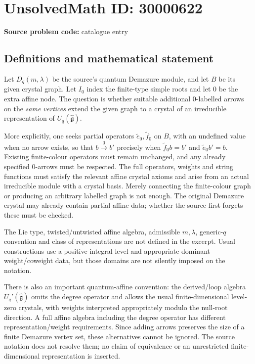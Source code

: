 \documentclass[11pt]{article}
\begin{document}
\section*{UnsolvedMath ID: 30000622}
\textbf{Source problem code:} catalogue entry
\subsection{Definitions and mathematical statement}
Let $D_q(m,\lambda)$ be the source's quantum Demazure module, and let $B$ be its given crystal graph. Let $I_0$ index the finite-type simple roots and let $0$ be the extra affine node. The question is whether suitable additional $0$-labelled arrows on the \emph{same vertices} extend the given graph to a crystal of an irreducible representation of $U_q(\widehat{\mathfrak g})$.

More explicitly, one seeks partial operators $\widetilde e_0,\widetilde f_0$ on $B$, with an undefined value when no arrow exists, so that $b\xrightarrow{0}b'$ precisely when $\widetilde f_0b=b'$ and $\widetilde e_0b'=b$. Existing finite-colour operators must remain unchanged, and any already specified $0$-arrows must be respected. The full operators, weights and string functions must satisfy the relevant affine crystal axioms and arise from an actual irreducible module with a crystal basis. Merely connecting the finite-colour graph or producing an arbitrary labelled graph is not enough. The original Demazure crystal may already contain partial affine data; whether the source first forgets these must be checked.

The Lie type, twisted/untwisted affine algebra, admissible $m,\lambda$, generic-$q$ convention and class of representations are not defined in the excerpt. Usual constructions use a positive integral level and appropriate dominant weight/coweight data, but those domains are not silently imposed on the notation.

There is also an important quantum-affine convention: the derived/loop algebra $U_q'(\widehat{\mathfrak g})$ omits the degree operator and allows the usual finite-dimensional level-zero crystals, with weights interpreted appropriately modulo the null-root direction. A full affine algebra including the degree operator has different representation/weight requirements. Since adding arrows preserves the size of a finite Demazure vertex set, these alternatives cannot be ignored. The source notation does not resolve them; no claim of equivalence or an unrestricted finite-dimensional representation is inserted.
\end{document}
